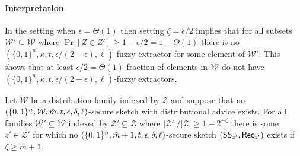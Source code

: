 \paragraph{Interpretation} 
%
In the setting when $\epsilon = \Theta(1)$ then setting $\zeta = \epsilon/2$ implies that for all subsets $\mathcal{W}' \subseteq \mathcal{W}$ where $\Pr[Z\in Z']\ge 1-\epsilon/2 = 1-\Theta(1)$ there is no $(\{0,1\}^n,\kappa, t, \epsilon/(2-\epsilon), \ell)$-fuzzy extractor for some element of $\mathcal{W}'$.  This shows that at least $\epsilon/2=\Theta(1)$ fraction of elements in $\mathcal{W}$ do not have $(\{0,1\}^n,\kappa, t, \epsilon/(2-\epsilon), \ell)$-fuzzy extractors. 


\begin{lemma}
Let $\mathcal{W}$ be a distribution family indexed by $\mathcal{Z}$ and suppose that no $(\{0, 1\}^n, \mathcal{W}, \tilde{m}, t, \epsilon, \delta, \ell)$-secure sketch with distributional advice exists.  For all families $\mathcal{W}'\subseteq \mathcal{W}$ indexed by $\mathcal{Z}'\subseteq \mathcal{Z}$ where $|\mathcal{Z}'|/|\mathcal{Z}|\ge 1-2^{-\zeta}$ 
there is some $z'\in \mathcal{Z}'$ for which no  $(\{0, 1\}^n, \tilde{m}+1, t, \epsilon, \delta, \ell)$-secure sketch $({\mathsf{SS}}_{z'}, {\mathsf{Rec}}_{z'})$  exists if $\zeta\ge \tilde{m}+1$.
\label{lem:distributional advice suffices ss}
\end{lemma}

